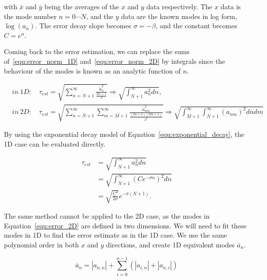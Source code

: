 \noindent
with \(\overline{x}\) and \(\overline{y}\) being the averages of the \(x\) and \(y\) data
respectively. The \(x\) data is the mode number \(n = 0 \cdots N\), and the \(y\) data are the known
modes in log form, \( \log(a_n) \). The error decay slope becomes \(\sigma = - \beta \), and the
constant becomes \(C = e^\alpha \).

Coming back to the error estimation, we can replace the sums of~\ref{equ:error_norm_1D}
and~\ref{equ:error_norm_2D} by integrals since the behaviour of the modes is known as an analytic
function of \(n\).

\begin{align}
    &{in}\ 1D: \quad \tau_{est} = \sqrt{\sum_{n = N + 1}^{\infty } \frac{\widetilde{a}_n^2}{\frac{2n + 1}{2}}} 
               \Rightarrow \sqrt{\int_{N + 1}^{\infty } a_n^2 dn}, \label{equ:error_1D}
    \\
    &{in}\ 2D: \quad \tau_{est} = \sqrt{\sum_{n = N + 1}^{\infty }\sum_{m = M + 1}^{\infty}\frac{\widetilde{a}^2_{nm}}{\frac{(2n + 1)(2m + 1)}{2^2}}}
               \Rightarrow \sqrt{\int_{M+1}^{\infty }\int_{N + 1 }^{\infty}{(a_{nm})}^2 dn dm} \label{equ:error_2D}
\end{align}

\noindent
By using the exponential decay model of Equation~\ref{equ:exponential_decay}, the 1D case can be
evaluated directly.

\begin{equation}
    \begin{aligned}
        \tau_{est} &= \sqrt{\int_{N + 1}^{\infty } a_n^2 dn} \\
        &= \sqrt{\int_{N + 1}^{\infty } {\left( Ce^{-\sigma n} \right)}^2 dn} \\
        &= \sqrt{\frac{C^2}{2\sigma }}e^{-\sigma (N + 1)}. 
    \end{aligned}
\end{equation}

The same method cannot be applied to the 2D case, as the modes in Equation~\ref{equ:error_2D} are
defined in two dimensions. We will need to fit these modes in 1D to find the error estimate as in
the 1D case. We use the same polynomial order in both \(x\) and \(y\) directions, and create 1D
equivalent modes \(\overline{a}_n\). 

\begin{equation}
    \overline{a}_n = \left| a_{n,n} \right| + \sum_{i = 0}^{n-1} \left( \left| a_{i, n} \right| + \left| a_{n, i} \right| \right)
\end{equation}

